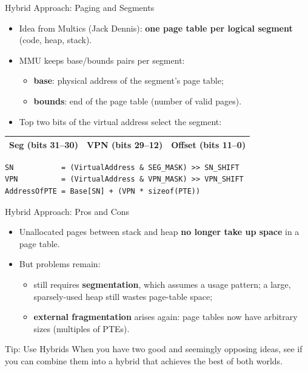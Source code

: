 \begin{frame}[fragile]{Hybrid Approach: Paging and Segments}

\begin{itemize}
    \item Idea from Multics (Jack Dennis): \textbf{one page table per
          logical segment} (code, heap, stack).
    \item MMU keeps base/bounds pairs per segment:
    \begin{itemize}
        \item \textbf{base}: physical address of the segment's page table;
        \item \textbf{bounds}: end of the page table (number of valid pages).
    \end{itemize}
    \item Top two bits of the virtual address select the segment:
\end{itemize}

\begin{center}
\renewcommand{\arraystretch}{1.3}
\begin{tabular}{|c|c|c|}
\hline
Seg (bits 31--30) & VPN (bits 29--12) & Offset (bits 11--0) \\
\hline
\end{tabular}
\end{center}

{\scriptsize
\begin{verbatim}
SN           = (VirtualAddress & SEG_MASK) >> SN_SHIFT
VPN          = (VirtualAddress & VPN_MASK) >> VPN_SHIFT
AddressOfPTE = Base[SN] + (VPN * sizeof(PTE))
\end{verbatim}
}

\end{frame}

\begin{frame}{Hybrid Approach: Pros and Cons}

\begin{itemize}
    \item Unallocated pages between stack and heap
          \textbf{no longer take up space} in a page table.
    \item But problems remain:
    \begin{itemize}
        \item still requires \textbf{segmentation}, which assumes a usage
              pattern; a large, sparsely-used heap still wastes page-table space;
        \item \textbf{external fragmentation} arises again: page tables now
              have arbitrary sizes (multiples of PTEs).
    \end{itemize}
\end{itemize}

\begin{block}{Tip: Use Hybrids}
When you have two good and seemingly opposing ideas, see if you can combine
them into a hybrid that achieves the best of both worlds.
\end{block}

\end{frame}

